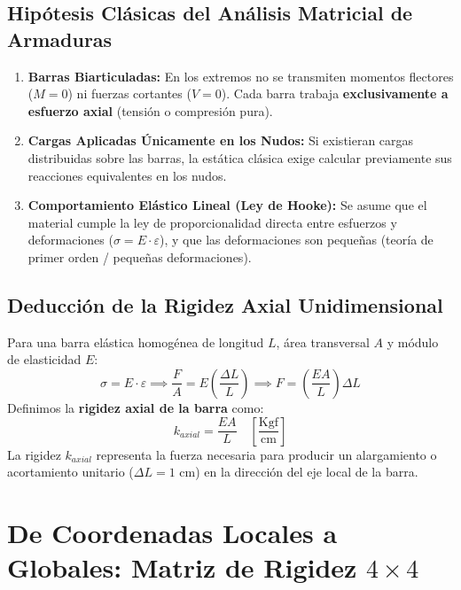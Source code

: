 \documentclass[11pt,a4paper]{article}
\begin{document}
\subsection{Hipótesis Clásicas del Análisis Matricial de Armaduras}
\begin{enumerate}
    \item \textbf{Barras Biarticuladas:} En los extremos no se transmiten momentos flectores ($M = 0$) ni fuerzas cortantes ($V = 0$). Cada barra trabaja \textbf{exclusivamente a esfuerzo axial} (tensión o compresión pura).
    \item \textbf{Cargas Aplicadas Únicamente en los Nudos:} Si existieran cargas distribuidas sobre las barras, la estática clásica exige calcular previamente sus reacciones equivalentes en los nudos.
    \item \textbf{Comportamiento Elástico Lineal (Ley de Hooke):} Se asume que el material cumple la ley de proporcionalidad directa entre esfuerzos y deformaciones ($\sigma = E \cdot \varepsilon$), y que las deformaciones son pequeñas (teoría de primer orden / pequeñas deformaciones).
\end{enumerate}

\subsection{Deducción de la Rigidez Axial Unidimensional}
Para una barra elástica homogénea de longitud $L$, área transversal $A$ y módulo de elasticidad $E$:
\begin{equation}
    \sigma = E \cdot \varepsilon \implies \frac{F}{A} = E \left(\frac{\Delta L}{L}\right) \implies F = \left(\frac{EA}{L}\right) \Delta L
\end{equation}
Definimos la \textbf{rigidez axial de la barra} como:
\begin{equation}
    k_{axial} = \frac{EA}{L} \quad \left[\frac{\text{Kgf}}{\text{cm}}\right]
\end{equation}
La rigidez $k_{axial}$ representa la fuerza necesaria para producir un alargamiento o acortamiento unitario ($\Delta L = 1\text{ cm}$) en la dirección del eje local de la barra.

\section{De Coordenadas Locales a Globales: Matriz de Rigidez $4 \times 4$}
\end{document}
